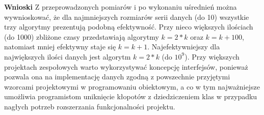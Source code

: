 \documentclass[10pt, a4paper]{article}
\begin{document}
\begin{flushleft}
\textbf{Wnioski} \newline \newline
Z przeprowadzonych pomiarów i po wykonaniu uśrednień można wywnioskować, że dla najmniejszych rozmiarów serii danych (do 10) wszystkie trzy algorytmy prezentują podobną efektywność. Przy nieco większych ilościach (do 1000) zbliżone czasy przedstawiają algorytmy $k=2*k$ oraz $k=k+100$, natomiast mniej efektywny staje się $k=k+1$. Najefektywniejszy dla największych ilości danych jest algorytm $k=2*k$ (do $10^9$). \newline \newline
Przy większych projektach zespołowych warto wykorzystywać koncepcję interfejsów, ponieważ pozwala ona na implementację danych zgodną z powszechnie przyjętymi wzorcami projektowymi w programowaniu obiektowym, a co w tym najważniejsze umożliwia programistom uniknięcie kłopotów z dziedziczeniem klas w przypadku nagłych potrzeb rozszerzania funkcjonalności projektu.

\end{flushleft}
\end{document}
